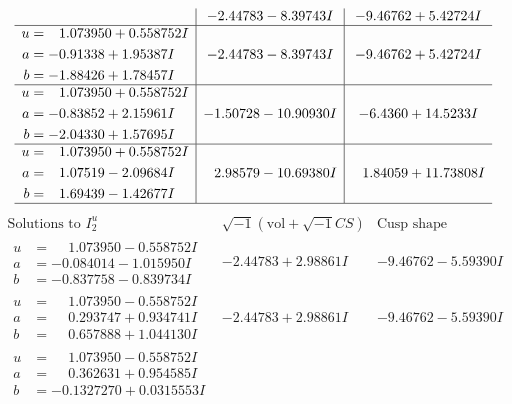 \documentclass[1p]{elsarticle_modified}
\theoremstyle{definition}
\newcommand{\I}{\sqrt{-1}}
\begin{document}
$$\begin{array}{c|c|c}
 & -2.44783 - 8.39743 I & -9.46762 + 5.42724 I \\ \hline\begin{aligned}
u &= \phantom{-}1.073950 + 0.558752 I \\
a &= -0.91338 + 1.95387 I \\
b &= -1.88426 + 1.78457 I\end{aligned}
 & -2.44783 - 8.39743 I & -9.46762 + 5.42724 I \\ \hline\begin{aligned}
u &= \phantom{-}1.073950 + 0.558752 I \\
a &= -0.83852 + 2.15961 I \\
b &= -2.04330 + 1.57695 I\end{aligned}
 & -1.50728 - 10.90930 I & -6.4360 + 14.5233 I \\ \hline\begin{aligned}
u &= \phantom{-}1.073950 + 0.558752 I \\
a &= \phantom{-}1.07519 - 2.09684 I \\
b &= \phantom{-}1.69439 - 1.42677 I\end{aligned}
 & \phantom{-}2.98579 - 10.69380 I & \phantom{-}1.84059 + 11.73808 I\\
 \hline 
 \end{array}$$\newpage$$\begin{array}{c|c|c}  
\text{Solutions to }I^u_{2}& \I (\text{vol} + \sqrt{-1}CS) & \text{Cusp shape}\\
 \hline 
\begin{aligned}
u &= \phantom{-}1.073950 - 0.558752 I \\
a &= -0.084014 - 1.015950 I \\
b &= -0.837758 - 0.839734 I\end{aligned}
 & -2.44783 + 2.98861 I & -9.46762 - 5.59390 I \\ \hline\begin{aligned}
u &= \phantom{-}1.073950 - 0.558752 I \\
a &= \phantom{-}0.293747 + 0.934741 I \\
b &= \phantom{-}0.657888 + 1.044130 I\end{aligned}
 & -2.44783 + 2.98861 I & -9.46762 - 5.59390 I \\ \hline\begin{aligned}
u &= \phantom{-}1.073950 - 0.558752 I \\
a &= \phantom{-}0.362631 + 0.954585 I \\
b &= -0.1327270 + 0.0315553 I\end{aligned}

\end{array}$$
\end{document}
